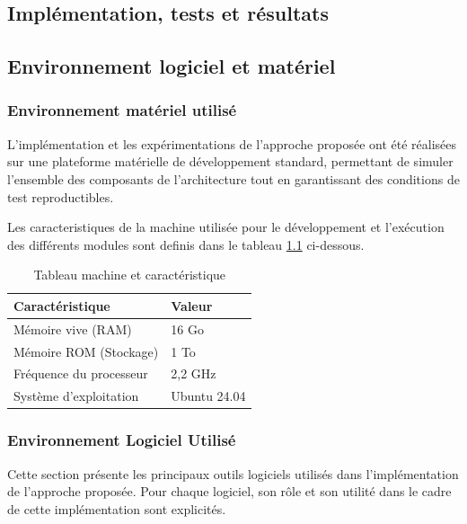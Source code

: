 \documentclass[12pt]{report}
\begin{document}
\begin{itemize}
\begin{itemize}
\chapter{Implémentation, tests et résultats}
\section{Environnement logiciel et matériel}
\subsection{Environnement matériel utilisé}

L’implémentation et les expérimentations de l’approche proposée ont été réalisées sur une plateforme matérielle de développement standard, permettant de simuler l’ensemble des composants de l’architecture tout en garantissant des conditions de test reproductibles.

Les caracteristiques de la machine utilisée pour le développement et l’exécution des différents modules sont definis dans le tableau \ref{tab:env_materiel} ci-dessous.
\begin{table}[h]
\centering
\caption{Tableau machine et caractéristique}
\label{tab:env_materiel}
\begin{tabular}{|l|l|}
\hline
\textbf{Caractéristique} & \textbf{Valeur} \\ \hline
Mémoire vive (RAM) & 16 Go \\ \hline
Mémoire ROM (Stockage) & 1 To \\ \hline
Fréquence du processeur & 2{,}2 GHz \\ \hline
Système d’exploitation & Ubuntu 24.04 \\ \hline
\end{tabular}
\end{table}

\subsection{Environnement Logiciel Utilisé}

Cette section présente les principaux outils logiciels utilisés dans l’implémentation de l’approche proposée. Pour chaque logiciel, son rôle et son utilité dans le cadre de cette implémentation sont explicités.


\end{itemize}
\end{itemize}
\end{document}

